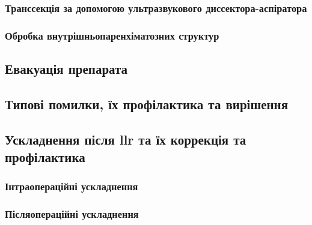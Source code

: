 \begin{refsection}
\subsubsection{Транссекція за допомогою ультразвукового диссектора-аспіратора}

\subsubsection{Обробка внутрішньопаренхіматозних структур}

\subsection{Евакуація препарата}

\subsection{Типові помилки, їх профілактика та вирішення}

\subsection{Ускладнення після \acrshort{llr} та їх коррекція та профілактика}

\subsubsection{Інтраопераційні ускладнення}

\subsubsection{Післяопераційні ускладнення}

\printbibliography [heading=subbibliography]
\end{refsection}